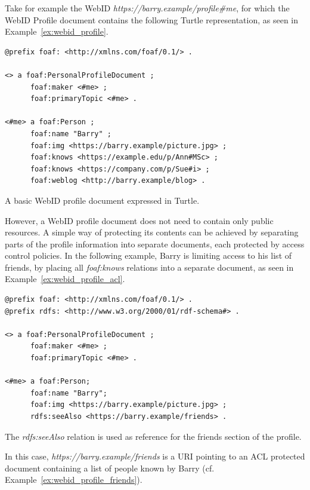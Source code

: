 Take for example the WebID \textit{https://barry.example/profile\#me}, for which the WebID Profile document contains the following Turtle representation, as seen in Example~\ref{ex:webid_profile}.

\begin{example}
\begin{verbatim}
@prefix foaf: <http://xmlns.com/foaf/0.1/> .

<> a foaf:PersonalProfileDocument ;
      foaf:maker <#me> ;
      foaf:primaryTopic <#me> .

<#me> a foaf:Person ; 
      foaf:name "Barry" ; 
      foaf:img <https://barry.example/picture.jpg> ;
      foaf:knows <https://example.edu/p/Ann#MSc> ;
      foaf:knows <https://company.com/p/Sue#i> ;
      foaf:weblog <http://barry.example/blog> .
\end{verbatim}
\caption{A basic WebID profile document expressed in Turtle.}
\label{ex:webid_profile}
\end{example}

However, a WebID profile document does not need to contain only public resources. A simple way of protecting its contents can be achieved by separating parts of the profile information into separate documents, each protected by access control policies. In the following example, Barry is limiting access to his list of friends, by placing all \textit{foaf:knows} relations into a separate document, as seen in Example~\ref{ex:webid_profile_acl}.

\begin{example}
\begin{verbatim}
@prefix foaf: <http://xmlns.com/foaf/0.1/> .
@prefix rdfs: <http://www.w3.org/2000/01/rdf-schema#> .

<> a foaf:PersonalProfileDocument ;
      foaf:maker <#me> ;
      foaf:primaryTopic <#me> .

<#me> a foaf:Person;
      foaf:name "Barry";
      foaf:img <https://barry.example/picture.jpg> ;
      rdfs:seeAlso <https://barry.example/friends> .
\end{verbatim}
\caption{The \textit{rdfs:seeAlso} relation is used as reference for the friends section of the profile.}
\label{ex:webid_profile_acl}
\end{example}

In this case, \textit{https://barry.example/friends} is a URI pointing to an ACL protected document containing a list of people known by Barry (cf. Example~\ref{ex:webid_profile_friends}).

